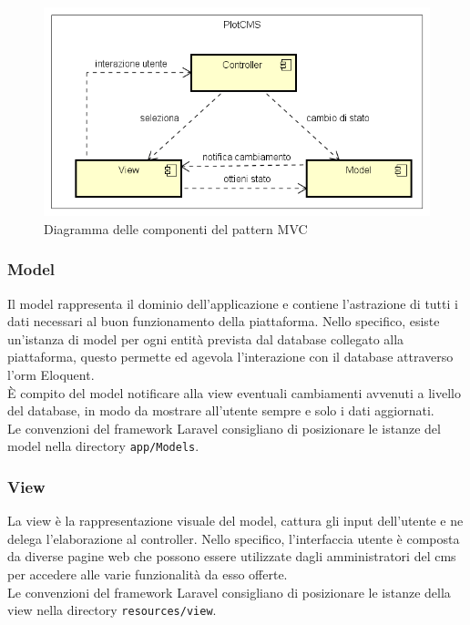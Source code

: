 \begin{figure}
	\centering
  \includegraphics[scale=0.7]{immagini/components/mvc_diagram.png}
  \caption{Diagramma delle componenti del pattern MVC}
	\label{fig:mvc} 
\end{figure}

\subsubsection{Model} %
Il model rappresenta il dominio dell'applicazione e contiene l'astrazione di tutti i dati necessari al buon funzionamento della piattaforma. Nello specifico, esiste un'istanza di model per ogni entità prevista dal database collegato alla piattaforma, questo permette ed agevola l'interazione con il database attraverso l'\gls{orm}\glsfirstoccur{} Eloquent. \\
È compito del model notificare alla view eventuali cambiamenti avvenuti a livello del database, in modo da mostrare all'utente sempre e solo i dati aggiornati. \\
Le convenzioni del framework Laravel consigliano di posizionare le istanze del model nella directory \verb!app/Models!.


\subsubsection{View} %
La view è la rappresentazione visuale del model, cattura gli input dell'utente e ne delega l'elaborazione al controller. Nello specifico, l'interfaccia utente è composta da diverse pagine web che possono essere utilizzate dagli amministratori del \gls{cms}\glsfirstoccur{} per accedere alle varie funzionalità da esso offerte. \\
Le convenzioni del framework Laravel consigliano di posizionare le istanze della view nella directory \verb!resources/view!.

